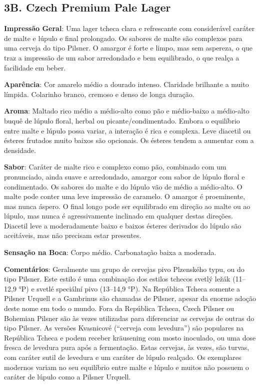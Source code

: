 \subsection*{3B. Czech Premium Pale Lager}

\textbf{Impressão Geral}: Uma lager tcheca clara e refrescante com considerável caráter de malte e lúpulo e final prolongado. Os sabores de malte são complexos para uma cerveja do tipo Pilsner. O amargor é forte e limpo, mas sem aspereza, o que traz a impressão de um sabor arredondado e bem equilibrado, o que realça a facilidade em beber.

\textbf{Aparência}: Cor amarelo médio a dourado intenso. Claridade brilhante a muito límpida. Colarinho branco, cremoso e denso de longa duração.

\textbf{Aroma}: Maltado rico médio a médio-alto como pão e médio-baixo a médio-alto buquê de lúpulo floral, herbal ou picante/condimentado. Embora o equilíbrio entre malte e lúpulo possa variar, a interação é rica e complexa. Leve diacetil ou ésteres frutados muito baixos são opcionais. Os ésteres tendem a aumentar com a densidade.

\textbf{Sabor}: Caráter de malte rico e complexo como pão, combinado com um pronunciado, ainda suave e arredondado, amargor com sabor de lúpulo floral e condimentado. Os sabores do malte e do lúpulo vão de médio a médio-alto. O malte pode conter uma leve impressão de caramelo. O amargor é proeminente, mas nunca áspero. O final longo pode ser equilibrado em direção ao malte ou ao lúpulo, mas nunca é agressivamente inclinado em qualquer destas direções. Diacetil leve a moderadamente baixo e baixos ésteres derivados do lúpulo são aceitáveis, mas não precisam estar presentes.

\textbf{Sensação na Boca}: Corpo médio. Carbonatação baixa a moderada.

\textbf{Comentários}: Geralmente um grupo de cervejas pivo Plzenského typu, ou do tipo Pilsner. Este estilo é uma combinação dos estilos tchecos svetlý ležák (11–12,9 °P) e svetlé speciální pivo (13–14,9 °P). Na República Tcheca somente a Pilsner Urquell e a Gambrinus são chamadas de Pilsner, apesar da enorme adoção deste nome em todo o mundo. Fora da República Tcheca, Czech Pilsner ou Bohemian Pilsner são às vezes utilizadas para diferenciar as cervejas de outras do tipo Pilsner. As versões Kvasnicové (“cerveja com levedura”) são populares na República Tcheca e podem receber kräusening com mosto inoculado, ou uma dose fresca de levedura pura após a fermentação. Estas cervejas, às vezes, são turvas, com caráter sutil de levedura e um caráter de lúpulo realçado. Os exemplares modernos variam no seu equilíbrio entre malte e lúpulo e muitos não possuem o caráter de lúpulo como a Pilsner Urquell.

